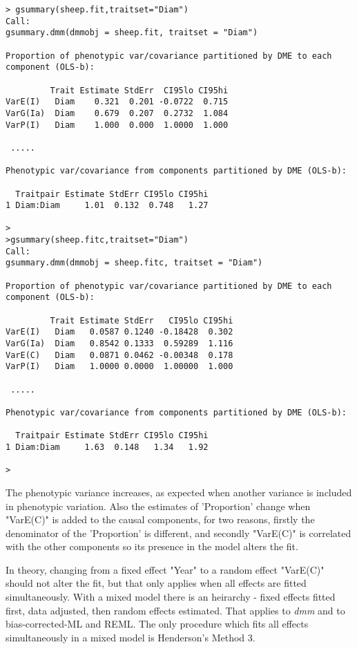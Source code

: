 \documentclass[titlepage]{article}  %
\begin{document}
\begin{verbatim}
> gsummary(sheep.fit,traitset="Diam")
Call:
gsummary.dmm(dmmobj = sheep.fit, traitset = "Diam")

Proportion of phenotypic var/covariance partitioned by DME to each component (OLS-b):

         Trait Estimate StdErr  CI95lo CI95hi
VarE(I)   Diam    0.321  0.201 -0.0722  0.715
VarG(Ia)  Diam    0.679  0.207  0.2732  1.084
VarP(I)   Diam    1.000  0.000  1.0000  1.000

 .....
 
Phenotypic var/covariance from components partitioned by DME (OLS-b):

  Traitpair Estimate StdErr CI95lo CI95hi
1 Diam:Diam     1.01  0.132  0.748   1.27

> 
>gsummary(sheep.fitc,traitset="Diam")
Call:
gsummary.dmm(dmmobj = sheep.fitc, traitset = "Diam")

Proportion of phenotypic var/covariance partitioned by DME to each component (OLS-b):

         Trait Estimate StdErr   CI95lo CI95hi
VarE(I)   Diam   0.0587 0.1240 -0.18428  0.302
VarG(Ia)  Diam   0.8542 0.1333  0.59289  1.116
VarE(C)   Diam   0.0871 0.0462 -0.00348  0.178
VarP(I)   Diam   1.0000 0.0000  1.00000  1.000

 .....

Phenotypic var/covariance from components partitioned by DME (OLS-b):

  Traitpair Estimate StdErr CI95lo CI95hi
1 Diam:Diam     1.63  0.148   1.34   1.92

> 
\end{verbatim}

  The phenotypic variance increases, as expected when another variance is included in phenotypic variation.
Also the estimates of 'Proportion'  change when "VarE(C)" is added to the causal components, for two reasons, firstly the denominator of the 'Proportion' is different, and secondly "VarE(C)" is correlated with the other components so its presence in the model alters the fit.

In theory, changing from a fixed effect "Year" to a random effect "VarE(C)" should not alter the fit, but that only applies when all effects are fitted simultaneously. With a mixed model there is an heirarchy - fixed effects fitted first, data adjusted, then random effects estimated. That applies to {\em dmm} and to bias-corrected-ML and REML. The only procedure which fits all effects simultaneously in a mixed model is Henderson's Method 3. 
\end{document}
